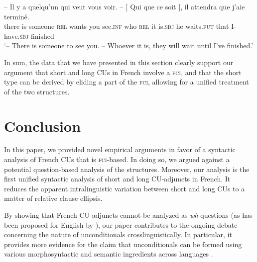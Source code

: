 \documentclass[output=paper]{langscibook}
\begin{document}
\ea\label{ex:gonzalez:cu-muller} 
 \gll -- {Il y a} quelqu'un qui veut vous voir. -- [$_{}$ Qui que ce soit $]$, il attendra que j'aie terminé. \\
 {} {there is} someone \textsc{rel} wants you see.\textsc{inf} {} {} who \textsc{rel} it is.\textsc{sbj} {} he waits.\textsc{fut} that I-have.\textsc{sbj} finished \\ %
 \glt `-- There is someone to see you. -- Whoever it is, they will wait until I've  finished.' 
\z


In sum, the data that we have presented in this section clearly support our argument that short and long CUs in French involve a \textsc{fci}, and that the short type can be derived by eliding a part of the \textsc{fci}, allowing for a unified treatment of the two structures.






\section{Conclusion}\label{sec:gonzalez:7}
 In this paper, we provided novel empirical arguments in favor of a syntactic analysis of French CUs that is \textsc{fci}-based. In doing so, we argued against a potential question-based analysis of the structures. Moreover, our analysis is the first unified syntactic analysis of short and long CU-adjuncts in French. It reduces the apparent intralinguistic variation between short and long CUs to a matter of relative clause ellipsis. 

By showing that French CU-adjuncts cannot be analyzed as \emph{wh}-questions (as has been proposed for English by \citealt{rawlins2013}), our paper contributes to the ongoing debate concerning the nature of unconditionals crosslinguistically.  In particular, it provides more evidence for the claim that unconditionals can be formed using
various morphosyntactic and semantic ingredients across languages \citep{lohiniva2019, simik2018, szabolcsi2018, falausnicolae2020, balusu2019}.


\end{document}
